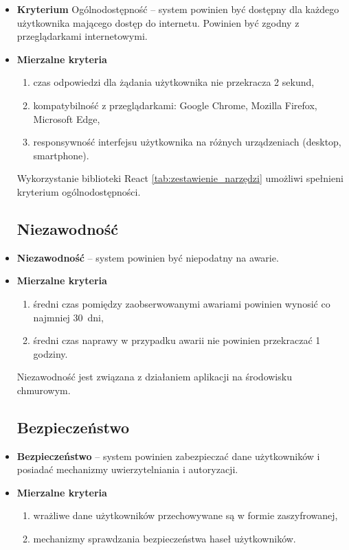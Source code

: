 \begin{itemize}
	\item \textbf{Kryterium} Ogólnodostępność -- system powinien być dostępny dla każdego użytkownika mającego dostęp do internetu. Powinien być zgodny z przeglądarkami internetowymi.
	\item \textbf{Mierzalne kryteria}
		\begin{enumerate}
			\item czas odpowiedzi dla żądania użytkownika nie przekracza 2 sekund,
			\item kompatybilność z przeglądarkami: Google Chrome, Mozilla Firefox, Microsoft Edge,
			\item responsywność interfejsu użytkownika na różnych urządzeniach (desktop, smartphone).
		\end{enumerate}
	Wykorzystanie biblioteki React \ref{tab:zestawienie_narzędzi} umożliwi spełnieni kryterium ogólnodostępności.
		
\subsection{Niezawodność}
	\item \textbf{Niezawodność} -- system powinien być niepodatny na awarie.
	\item \textbf{Mierzalne kryteria}
		\begin{enumerate}
			\item średni czas pomiędzy zaobserwowanymi awariami powinien wynosić co najmniej 30~dni,
			\item średni czas naprawy w przypadku awarii nie powinien przekraczać 1 godziny.
		\end{enumerate}
	Niezawodność jest związana z działaniem aplikacji na środowisku chmurowym. 
	
	\subsection{Bezpieczeństwo}
	
	\item \textbf{Bezpieczeństwo} -- system powinien zabezpieczać dane użytkowników i posiadać mechanizmy uwierzytelniania i autoryzacji.
	\item \textbf{Mierzalne kryteria}
		\begin{enumerate}
			\item wrażliwe dane użytkowników przechowywane są w formie zaszyfrowanej,
			\item mechanizmy sprawdzania bezpieczeństwa haseł użytkowników.
		\end{enumerate}
		

\end{itemize}
